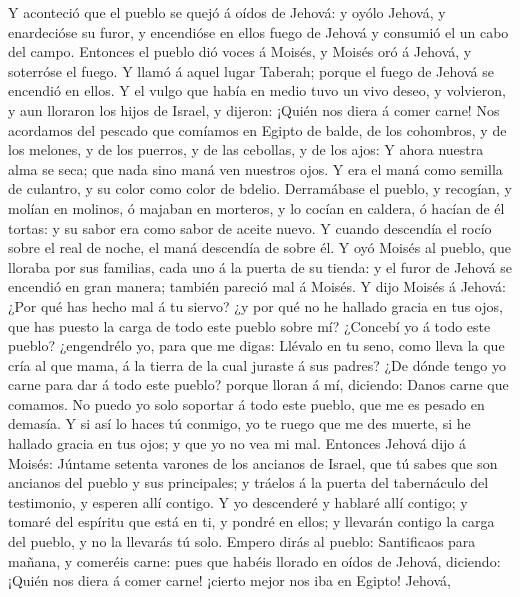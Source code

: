  Y aconteció que el pueblo se quejó á oídos de Jehová: y
oyólo Jehová, y enardecióse su furor, y encendióse en ellos fuego de
Jehová y consumió el un cabo del campo.  Entonces el
pueblo dió voces á Moisés, y Moisés oró á Jehová, y soterróse el fuego.
 Y llamó á aquel lugar Taberah; porque el fuego de Jehová
se encendió en ellos.  Y el vulgo que había en medio tuvo
un vivo deseo, y volvieron, y aun lloraron los hijos de Israel, y
dijeron: ¡Quién nos diera á comer carne!  Nos acordamos
del pescado que comíamos en Egipto de balde, de los cohombros, y de los
melones, y de los puerros, y de las cebollas, y de los ajos:
 Y ahora nuestra alma se seca; que nada sino maná ven
nuestros ojos.  Y era el maná como semilla de culantro, y
su color como color de bdelio.  Derramábase el pueblo, y
recogían, y molían en molinos, ó majaban en morteros, y lo cocían en
caldera, ó hacían de él tortas: y su sabor era como sabor de aceite
nuevo.  Y cuando descendía el rocío sobre el real de
noche, el maná descendía de sobre él.  Y oyó Moisés al
pueblo, que lloraba por sus familias, cada uno á la puerta de su tienda:
y el furor de Jehová se encendió en gran manera; también pareció mal á
Moisés.  Y dijo Moisés á Jehová: ¿Por qué has hecho mal á
tu siervo? ¿y por qué no he hallado gracia en tus ojos, que has puesto
la carga de todo este pueblo sobre mí?  ¿Concebí yo á
todo este pueblo? ¿engendrélo yo, para que me digas: Llévalo en tu seno,
como lleva la que cría al que mama, á la tierra de la cual juraste á sus
padres?  ¿De dónde tengo yo carne para dar á todo este
pueblo? porque lloran á mí, diciendo: Danos carne que comamos.
 No puedo yo solo soportar á todo este pueblo, que me es
pesado en demasía.  Y si así lo haces tú conmigo, yo te
ruego que me des muerte, si he hallado gracia en tus ojos; y que yo no
vea mi mal.  Entonces Jehová dijo á Moisés: Júntame
setenta varones de los ancianos de Israel, que tú sabes que son ancianos
del pueblo y sus principales; y tráelos á la puerta del tabernáculo del
testimonio, y esperen allí contigo.  Y yo descenderé y
hablaré allí contigo; y tomaré del espíritu que está en ti, y pondré en
ellos; y llevarán contigo la carga del pueblo, y no la llevarás tú solo.
 Empero dirás al pueblo: Santificaos para mañana, y
comeréis carne: pues que habéis llorado en oídos de Jehová, diciendo:
¡Quién nos diera á comer carne! ¡cierto mejor nos iba en Egipto! Jehová,

